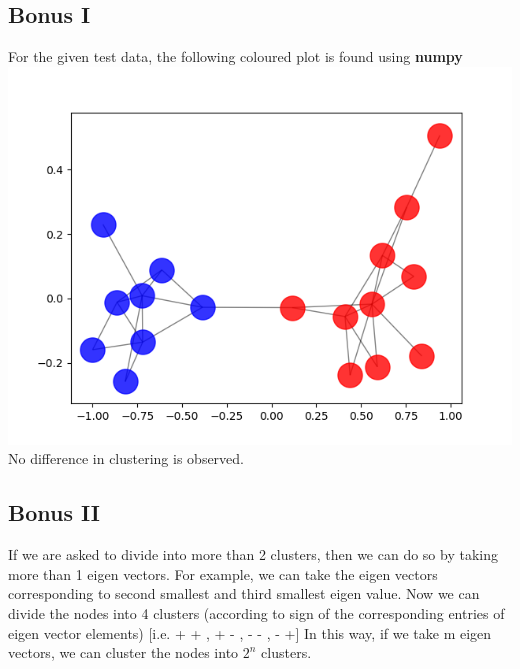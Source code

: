 \documentclass[runningheads]{llncs}
\begin{document}
\subsection{Bonus I}
For the given test data, the following coloured plot is found using \textbf{numpy} \\
\includegraphics[scale=0.5]{problem_1_bonus_1} \\
No difference in clustering is observed. 

\subsection{Bonus II}
If we are asked to divide into more than 2 clusters, then we can do so by taking more than 1 eigen vectors. For example, we can take the eigen vectors corresponding to second smallest and third smallest eigen value. Now we can divide the nodes into 4 clusters (according to sign of the corresponding entries of eigen vector elements)
[i.e. + + , + - , - - , - +]
In this way,  if we take m eigen vectors, we can cluster the nodes into $2^n$ clusters.
\end{document}
